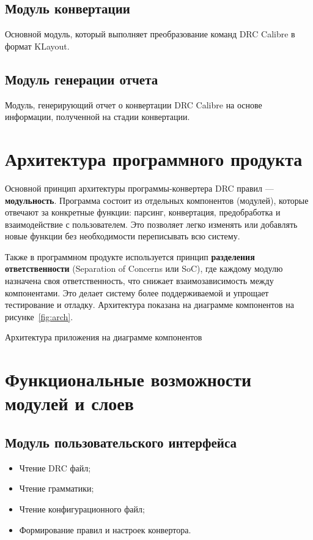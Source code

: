 \subsection{Модуль конвертации}
Основной модуль, который выполняет преобразование команд DRC Calibre
в формат KLayout.

\subsection{Модуль генерации отчета}
Модуль, генерирующий отчет о конвертации DRC Calibre на основе информации,
полученной на стадии конвертации.

\section{Архитектура программного продукта}

Основной принцип архитектуры программы-конвертера DRC правил
--- \textbf{модульность}.
Программа состоит из отдельных компонентов (модулей),
которые отвечают за конкретные функции:
парсинг, конвертация, предобработка и взаимодействие с пользователем.
Это позволяет легко изменять или добавлять новые функции
без необходимости переписывать всю систему.\par
Также в программном продукте используется принцип
\textbf{разделения ответственности} 
(Separation of Concerns или SoC), где каждому модулю назначена
своя ответственность, что снижает взаимозависимость между компонентами.
Это делает систему более поддерживаемой и упрощает тестирование и отладку.
Архитектура показана на диаграмме компонентов на рисунке~\ref{fig:arch}.

\begin{image}
	\caption{Архитектура приложения на диаграмме компонентов}
	\label{fig:arch}
\end{image}


\section{Функциональные возможности модулей и слоев}

\subsection{Модуль пользовательского интерфейса}
\begin{itemize}
	\item Чтение DRC файл;
	\item Чтение грамматики;
	\item Чтение конфигурационного файл;
	\item Формирование правил и настроек конвертора.
\end{itemize}

